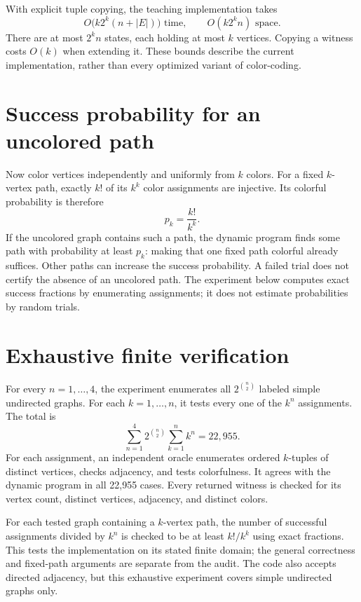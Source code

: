 \documentclass[10pt,letterpaper]{article}
\begin{document}
With explicit tuple copying, the teaching implementation takes
\[
 O\bigl(k2^k(n+|E|)\bigr)\text{ time},\qquad
 O(k2^k n)\text{ space}.
\]
There are at most $2^k n$ states, each holding at most $k$ vertices. Copying a
witness costs $O(k)$ when extending it. These bounds describe the current
implementation, rather than every optimized variant of color-coding.

\section{Success probability for an uncolored path}
Now color vertices independently and uniformly from $k$ colors. For a fixed
$k$-vertex path, exactly $k!$ of its $k^k$ color assignments are injective.
Its colorful probability is therefore
\[
 p_k=\frac{k!}{k^k}.
\]
If the uncolored graph contains such a path, the dynamic program finds some
path with probability at least $p_k$: making that one fixed path colorful
already suffices. Other paths can increase the success probability.
A failed trial does not certify the absence of an uncolored path. The
experiment below computes exact success fractions by enumerating assignments;
it does not estimate probabilities by random trials.

\section{Exhaustive finite verification}
For every $n=1,\ldots,4$, the experiment enumerates all
$2^{\binom n2}$ labeled simple undirected graphs. For each $k=1,\ldots,n$,
it tests every one of the $k^n$ assignments. The total is
\[
 \sum_{n=1}^{4}2^{\binom n2}\sum_{k=1}^{n}k^n=22{,}955.
\]
For each assignment, an independent oracle enumerates ordered $k$-tuples of
distinct vertices, checks adjacency, and tests colorfulness. It agrees with
the dynamic program in all 22,955 cases. Every returned witness is checked
for its vertex count, distinct vertices, adjacency, and distinct colors.

For each tested graph containing a $k$-vertex path, the number of successful
assignments divided by $k^n$ is checked to be at least $k!/k^k$ using exact
fractions. This tests the implementation on its stated finite domain; the
general correctness and fixed-path arguments are separate from the audit.
The code also accepts directed adjacency, but this exhaustive experiment
covers simple undirected graphs only.
\end{document}

